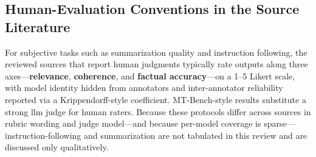 \subsection{Human-Evaluation Conventions in the Source Literature}
\label{subsec:appendix_human_eval}
For subjective tasks such as summarization quality and instruction following, the reviewed sources that report human judgments typically rate outputs along three axes---\textbf{relevance}, \textbf{coherence}, and \textbf{factual accuracy}---on a 1--5 Likert scale, with model identity hidden from annotators and inter-annotator reliability reported via a Krippendorff-style coefficient. MT-Bench-style results substitute a strong \gls{llm} judge for human raters. Because these protocols differ across sources in rubric wording and judge model---and because per-model coverage is sparse---instruction-following and summarization are not tabulated in this review and are discussed only qualitatively.

